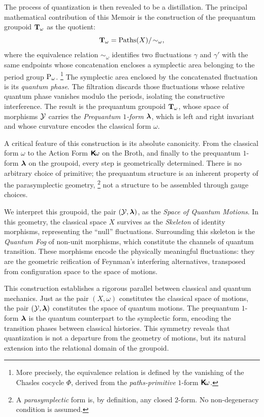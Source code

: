 \documentclass[10pt,reqno,letterpaper,twoside]{amsbook}
\begin{document}
  The process of quantization is then revealed to be a distillation.
  The principal mathematical contribution of this Memoir is the construction of the prequantum groupoid $\mathbf{T}_\omega$ as the quotient:
  \[
    \mathbf{T}_\omega = \operatorname{Paths}(X)/\!\sim_\omega,
    \]
  where the equivalence relation $\sim_\omega$ identifies two fluctuations $\gamma$ and $\gamma'$
  with the same endpoints whose concatenation encloses a symplectic area belonging to the period group $\operatorname{P}_\omega$.%
  \footnote{More precisely,
  the equivalence relation is defined by the vanishing of the Chasles cocycle $\Phi$,
  derived from the \emph{paths-primitive} $1$-form $\boldsymbol{\mathsf{K}}\!\omega$.}
  The symplectic area enclosed by the concatenated fluctuation is its \emph{quantum phase}.
  The filtration discards those fluctuations whose relative quantum phase vanishes modulo the periods,
  isolating the constructive interference.
  The result is the prequantum groupoid $\mathbf{T}_\omega$,
  whose space of morphisms $\mathcal{Y}$ carries the \emph{Prequantum $1$-form} $\boldsymbol \lambda$,
  which is left and right invariant and whose curvature encodes the classical form $\omega$.
  
  A critical feature of this construction is its absolute canonicity.
  From the classical form $\omega$ to the Action Form $\boldsymbol{\mathsf{K}}\!\omega$ on the Broth,
  and finally to the prequantum $1$-form $\boldsymbol \lambda$ on the groupoid,
  every step is geometrically determined.
  There is no arbitrary choice of primitive;
  the prequantum structure is an inherent property of the parasymplectic geometry,%
  \footnote{A \emph{parasymplectic} form is,
  by definition,
  any closed $2$-form.
  No non-degeneracy condition is assumed.}
  not a structure to be assembled through gauge choices.
  
  We interpret this groupoid,
  the pair $(\mathcal{Y},\boldsymbol \lambda)$,
  as the \emph{Space of Quantum Motions}.
  In this geometry,
  the classical space $X$ survives as the \emph{Skeleton} of identity morphisms,
  representing the ``null'' fluctuations.
  Surrounding this skeleton is the \emph{Quantum Fog} of non-unit morphisms,
  which constitute the channels of quantum transition.
  These morphisms encode the physically meaningful fluctuations:
  they are the geometric reification of Feynman's interfering alternatives,
  transposed from configuration space to the space of motions.
  
  This construction establishes a rigorous parallel between classical and quantum mechanics.
  Just as the pair $(X, \omega)$ constitutes the classical space of motions,
  the pair $(\mathcal{Y}, \boldsymbol \lambda)$ constitutes the space of quantum motions.
  The prequantum $1$-form $\boldsymbol \lambda$ is the quantum counterpart to the symplectic form,
  encoding the transition phases between classical histories.
  This symmetry reveals that quantization is not a departure from the geometry of motions,
  but its natural extension into the relational domain of the groupoid.
  
\end{document}
